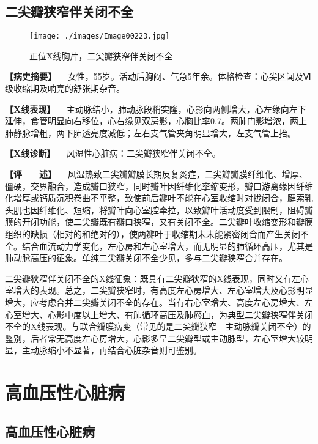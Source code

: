 \subsection{二尖瓣狭窄伴关闭不全}

\begin{figure}[!htbp]
 \centering
 \texttt{[image: ./images/Image00223.jpg]}
 \captionsetup{justification=centering}
 \caption{正位X线胸片，二尖瓣狭窄伴关闭不全}
 \label{fig4-3-2}
  \end{figure} 

\textbf{【病史摘要】}
　女性，55岁。活动后胸闷、气急5年余。体格检查：心尖区闻及Ⅵ级收缩期及响亮的舒张期杂音。

\textbf{【X线表现】}
　主动脉结小，肺动脉段稍突隆，心影向两侧增大，心左缘向左下延伸，食管明显向右移位，心右缘见双房影，心胸比率0.7。两肺门影增浓，两上肺静脉增粗，两下肺透亮度减低；左右支气管夹角明显增大，左支气管上抬。

\textbf{【X线诊断】} 　风湿性心脏病：二尖瓣狭窄伴关闭不全。

\textbf{【评　　述】}
　风湿热致二尖瓣瓣膜长期反复炎症，二尖瓣瓣膜纤维化、增厚、僵硬，交界融合，造成瓣口狭窄，同时瓣叶因纤维化挛缩变形，瓣口游离缘因纤维化增厚或钙质沉积卷曲不平整，致使前后瓣叶不能在心室收缩时对拢闭合，腱索乳头肌也因纤维化、短缩，将瓣叶向心室腔牵拉，以致瓣叶活动度受到限制，阻碍瓣膜的开闭功能，使二尖瓣既有瓣口狭窄，又有关闭不全。二尖瓣叶收缩变形和瓣膜组织的缺损（相对的和绝对的），使两瓣叶于收缩期末未能紧密闭合而产生关闭不全。结合血流动力学变化，左心房和左心室增大，而无明显的肺循环高压，尤其是肺动脉高压的征象。单纯二尖瓣关闭不全少见，多与二尖瓣狭窄合并存在。

二尖瓣狭窄伴关闭不全的X线征象：既具有二尖瓣狭窄的X线表现，同时又有左心室增大的表现。总之，二尖瓣狭窄时，有高度左心房增大、左心室增大及心影明显增大，应考虑合并二尖瓣关闭不全的存在。当有右心室增大、高度左心房增大、左心室增大、心影中度以上增大、有肺循环高压及肺瘀血，为典型二尖瓣狭窄伴关闭不全的X线表现。与联合瓣膜病变（常见的是二尖瓣狭窄＋主动脉瓣关闭不全）的鉴别，后者常无高度左心房增大，心影多呈二尖瓣型或主动脉型，左心室增大较明显，主动脉缩小不显著，再结合心脏杂音则可鉴别。

\section{高血压性心脏病}

\subsection{高血压性心脏病}

